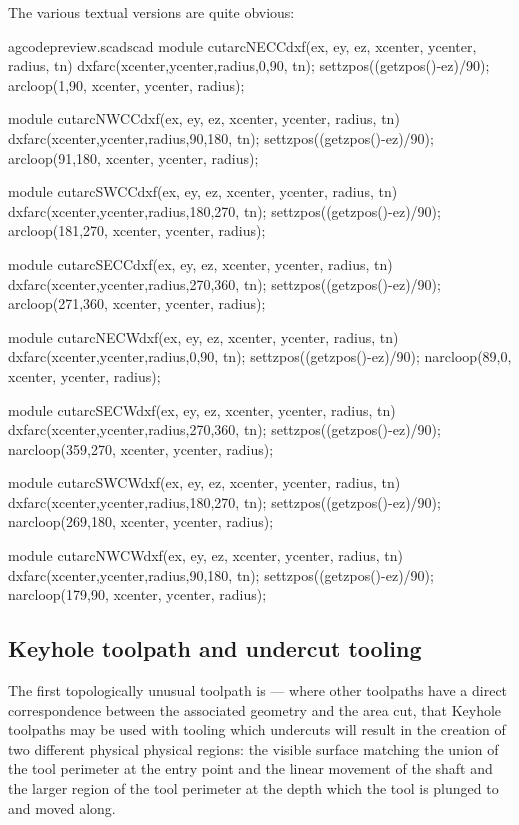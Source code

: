 \documentclass{ltxdoc}
\begin{document}
The various textual versions are quite obvious:

\lstset{firstnumber=\thegcpscad}
\begin{writecode}{a}{gcodepreview.scad}{scad}
module cutarcNECCdxf(ex, ey, ez, xcenter, ycenter, radius, tn) {
  dxfarc(xcenter,ycenter,radius,0,90, tn);
  settzpos((getzpos()-ez)/90);
    arcloop(1,90, xcenter, ycenter, radius);
}

module cutarcNWCCdxf(ex, ey, ez, xcenter, ycenter, radius, tn) {
  dxfarc(xcenter,ycenter,radius,90,180, tn);
  settzpos((getzpos()-ez)/90);
    arcloop(91,180, xcenter, ycenter, radius);
}

module cutarcSWCCdxf(ex, ey, ez, xcenter, ycenter, radius, tn) {
  dxfarc(xcenter,ycenter,radius,180,270, tn);
  settzpos((getzpos()-ez)/90);
    arcloop(181,270, xcenter, ycenter, radius);
}

module cutarcSECCdxf(ex, ey, ez, xcenter, ycenter, radius, tn) {
  dxfarc(xcenter,ycenter,radius,270,360, tn);
  settzpos((getzpos()-ez)/90);
    arcloop(271,360, xcenter, ycenter, radius);
}

module cutarcNECWdxf(ex, ey, ez, xcenter, ycenter, radius, tn) {
  dxfarc(xcenter,ycenter,radius,0,90, tn);
  settzpos((getzpos()-ez)/90);
    narcloop(89,0, xcenter, ycenter, radius);
}

module cutarcSECWdxf(ex, ey, ez, xcenter, ycenter, radius, tn) {
  dxfarc(xcenter,ycenter,radius,270,360, tn);
  settzpos((getzpos()-ez)/90);
    narcloop(359,270, xcenter, ycenter, radius);
}

module cutarcSWCWdxf(ex, ey, ez, xcenter, ycenter, radius, tn) {
  dxfarc(xcenter,ycenter,radius,180,270, tn);
  settzpos((getzpos()-ez)/90);
    narcloop(269,180, xcenter, ycenter, radius);
}

module cutarcNWCWdxf(ex, ey, ez, xcenter, ycenter, radius, tn) {
  dxfarc(xcenter,ycenter,radius,90,180, tn);
  settzpos((getzpos()-ez)/90);
    narcloop(179,90, xcenter, ycenter, radius);
}

\end{writecode}
\addtocounter{gcpscad}{48}
 
\subsection{Keyhole toolpath and undercut tooling}
 
\label{subsec:keyholetoolpaths}
The first topologically unusual toolpath is  --- where 
other toolpaths have a 
direct correspondence between the associated geometry and the area cut, that Keyhole toolpaths
may be used with tooling which undercuts will result in the creation of two different physical
physical regions: the visible surface matching the union of the tool perimeter at the entry point
and the linear movement of the shaft and the larger region of the tool perimeter at the depth
which the tool is plunged to and moved along.
 
\end{document}
